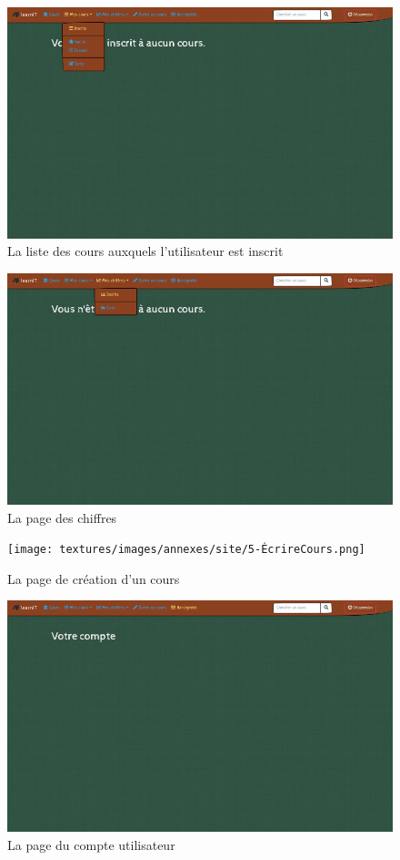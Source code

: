 \begin{figure}[!h]
    \centering
    \includegraphics[scale=1]{textures/images/annexes/site/3-MesCours.png}
    \caption{La liste des cours auxquels l'utilisateur est inscrit}
\end{figure}
\begin{figure}[!h]
    \centering
    \includegraphics[scale=1]{textures/images/annexes/site/4-MesChiffres(Cours).png}
    \caption{La page des chiffres}
\end{figure}

\newpage

\begin{figure}[!h]
    \centering
    \texttt{[image: textures/images/annexes/site/5-ÉcrireCours.png]}
    \caption{La page de création d'un cours}
\end{figure}
\begin{figure}[!h]
    \centering
    \includegraphics[scale=1]{textures/images/annexes/site/6-Compte(utilisateur).png}
    \caption{La page du compte utilisateur}
\end{figure}